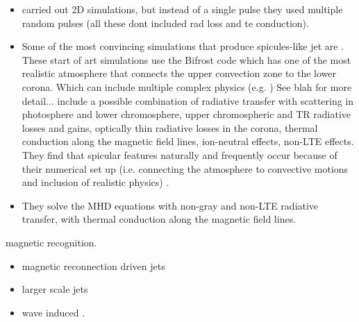 \begin{itemize}
\item \cite{Kudoh1999ApJ514493K} carried out 2D simulations, but instead of a single \Alfvenic pulse they used multiple random \Alfvenic pulses (all these dont included rad loss and te conduction).  
\item Some of the most convincing simulations that produce spicules-like jet are \citep{Mart2017Sci3561269M,Mart2018ApJ860116M,Mart2020ApJ88995M}. These start of art simulations use the Bifrost code \citep{Gudiksen2011AA531A154G} which has one of the most realistic atmosphere that connects the upper convection zone to the lower corona. Which can include multiple complex physics (e.g. ) See blah for more detail... include a possible combination of radiative transfer with scattering in photosphere and lower chromosphere, upper chromospheric and TR radiative losses and gains, optically thin radiative losses in the corona, thermal conduction along the magnetic field lines, ion-neutral effects, non-LTE effects. They find that spicular features naturally and frequently occur because of their numerical set up (i.e. connecting the atmosphere to convective motions and inclusion of realistic physics) \cite{Mart2017Sci3561269M}. 
\item They solve the MHD equations with non-gray and non-LTE radiative transfer, with thermal conduction along the magnetic field lines. 
\end{itemize}
magnetic recognition.
\begin{itemize}
\item magnetic reconnection driven jets \cite{Gonz2018arXiv180704224G,Gonz2018ApJ856176G,Gonz2017ApJ,Isobe2008ApJ679L57I,Archontis2005ApJ6351299A} 
\item larger scale jets \cite{Yokoyama1995Natur37542Y,Yokoyama1996PASJ48353Y,Nishizuka2008ApJ683L83N}
\item wave induced \cite{Heggland2009ApJ7021H}.
\end{itemize}
